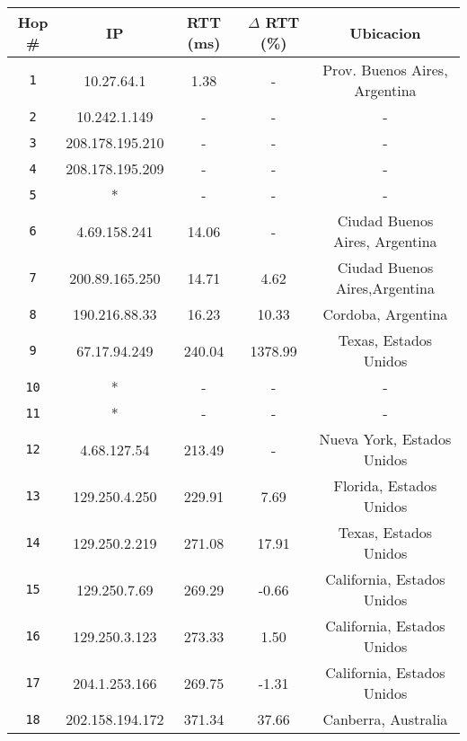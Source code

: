 \begin{table}[ht]\begin{center}
    \begin{tabular}{|c|c|c|c|c|}
    \hline
    \textbf{Hop \#} & \textbf{IP}& \textbf{RTT (ms)} & \textbf{$\Delta$ RTT (\%)} & \textbf{Ubicacion} \\ \hline
    \texttt{1} & 10.27.64.1      & 1.38    & -       & Prov. Buenos Aires, Argentina   \\ \hline
    \texttt{2} & 10.242.1.149    & -       & -       & -   \\ \hline
    \texttt{3} & 208.178.195.210 & -       & -       & -   \\ \hline
    \texttt{4} & 208.178.195.209 & -       & -       & -   \\ \hline
    \texttt{5} & *                & -       & -       & -   \\ \hline
    \texttt{6} & 4.69.158.241     & 14.06   & -       & Ciudad Buenos Aires, Argentina    \\ \hline
    \texttt{7} & 200.89.165.250   & 14.71    & 4.62   & Ciudad Buenos Aires,Argentina   \\ \hline
    \texttt{8} & 190.216.88.33    & 16.23    & 10.33  & Cordoba, Argentina   \\ \hline
    \texttt{9} & 67.17.94.249     & 240.04  & 1378.99 & Texas, Estados Unidos   \\ \hline
    \texttt{10} & *               & -       & -       & -   \\ \hline
    \texttt{11} & *               & -       & -       & -    \\ \hline
    \texttt{12} & 4.68.127.54     & 213.49  & -       & Nueva York, Estados Unidos   \\ \hline
    \texttt{13} & 129.250.4.250   & 229.91  & 7.69    & Florida, Estados Unidos   \\ \hline
    \texttt{14} & 129.250.2.219   & 271.08  & 17.91   & Texas, Estados Unidos   \\ \hline
    \texttt{15} & 129.250.7.69    & 269.29  & -0.66   & California, Estados Unidos   \\ \hline
    \texttt{16} & 129.250.3.123   & 273.33  & 1.50    & California, Estados Unidos    \\ \hline
    \texttt{17} & 204.1.253.166   & 269.75  & -1.31   & California, Estados Unidos   \\ \hline
    \texttt{18} & 202.158.194.172 & 371.34  & 37.66   & Canberra, Australia   \\ \hline

\end{tabular}
\end{center}
\end{table}

